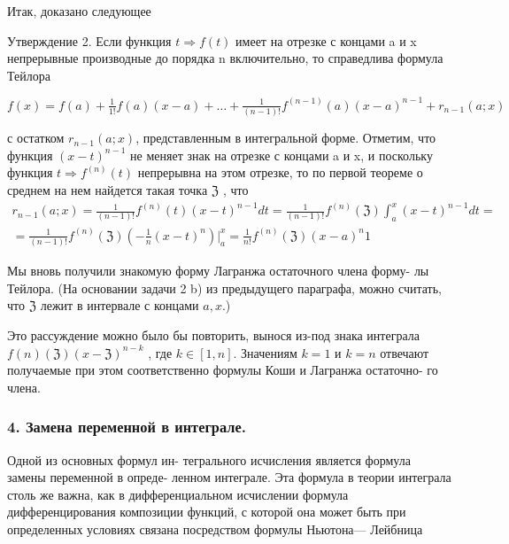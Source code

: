 \documentclass[14pt]{extreport}
\begin{document}
Итак, доказано следующее

Утверждение 2. Если функция $t \Rightarrow  f (t)$ имеет на отрезке с концами a
и x непрерывные производные до порядка n включительно, то справедлива
формула Тейлора

\begin{center}
	$
	f(x)=f(a)+\frac{1}{1!}f(a)(x-a)+\dots+\frac{1}{(n-1)!}f^{(n-1)}(a)(x-a)^{n-1}+r_{n-1}(a;x)
	$
\end{center}



с остатком $r_{n-1}(a; x)$, представленным в интегральной форме.
Отметим, что функция $(x - t)^{n-1}$ не меняет знак на отрезке с концами a и
x, и поскольку функция $t\Rightarrow  f ^{(n)}(t)$ непрерывна на этом отрезке, то по первой
теореме о среднем на нем найдется такая точка $\mathfrak{Z}$ , что
\begin{multline}
	r_{n-1}(a;x)=\frac{1}{(n-1)!} f^{(n)}(t)(x-t)^{n-1}dt = \frac{1}{(n-1)!} f^(n)(\mathfrak{Z}) \int^x_a (x-t)^{n-1}dt=\\
	=\frac{1}{(n-1)!} f^{(n)}(\mathfrak{Z})(-\frac{1}{n}(x-t)^n)|^x_a=\frac{1}{n!}f^{(n)}(\mathfrak{Z})(x-a)^n
	1
\end{multline}

Мы вновь получили знакомую форму Лагранжа остаточного члена форму-
лы Тейлора. (На основании задачи 2 b) из предыдущего параграфа, можно
считать, что $\mathfrak{Z}$ лежит в интервале с концами $a, x$.)

Это рассуждение можно было бы повторить, вынося из-под знака интеграла $f (n)(\mathfrak{Z})(x - \mathfrak{Z})^{n-k}$ , где $k \in [1, n]$. Значениям $k = 1$ и $k = n$ отвечают
получаемые при этом соответственно формулы Коши и Лагранжа остаточно-
го члена.

\subsubsection{4. Замена переменной в интеграле.} Одной из основных формул ин-
тегрального исчисления является формула замены переменной в опреде-
ленном интеграле. Эта формула в теории интеграла столь же важна, как в
дифференциальном исчислении формула дифференцирования композиции
функций, с которой она может быть при определенных условиях связана
посредством формулы Ньютона— Лейбница
\end{document}
